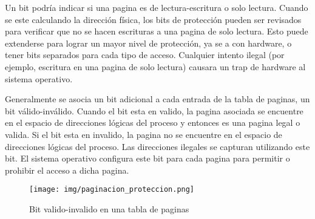 \documentclass{article}
\begin{document}
Un bit podría indicar si una pagina es de lectura-escritura o solo lectura. Cuando se este calculando la dirección física, los bits de protección pueden ser revisados para verificar que no se hacen escrituras a una pagina de solo lectura. Esto puede extenderse para lograr un mayor nivel de protección, ya se a con hardware, o tener bits separados para cada tipo de acceso. Cualquier intento ilegal (por ejemplo, escritura en una pagina de solo lectura) causara un trap de hardware al sistema operativo.

Generalmente se asocia un bit adicional a cada entrada de la tabla de paginas, un bit válido-inválido. Cuando el bit esta en valido, la pagina asociada se encuentre en el espacio de direcciones lógicas del proceso y entonces es una pagina legal o valida. Si el bit esta en invalido, la pagina no se encuentre en el espacio de direcciones lógicas del proceso. Las direcciones ilegales se capturan utilizando este bit. El sistema operativo configura este bit para cada pagina para permitir o prohibir el acceso a dicha pagina.

\begin{figure}[H]
	\centering
	\texttt{[image: img/paginacion\_proteccion.png]}
	\caption{Bit valido-invalido en una tabla de paginas}
\end{figure}
%
%
\end{document}
